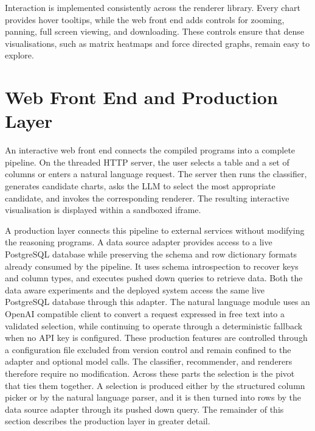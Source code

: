 
Interaction is implemented consistently across the renderer library. Every chart provides hover tooltips, while the web front end adds controls for zooming, panning, full screen viewing, and downloading. These controls ensure that dense visualisations, such as matrix heatmaps and force directed graphs, remain easy to explore.


\section{Web Front End and Production Layer}
\label{sec:impl-production}

An interactive web front end connects the compiled programs into a complete pipeline. On the threaded HTTP server, the user selects a table and a set of columns or enters a natural language request. The server then runs the classifier, generates candidate charts, asks the LLM to select the most appropriate candidate, and invokes the corresponding renderer. The resulting interactive visualisation is displayed within a sandboxed iframe. 

A production layer connects this pipeline to external services without modifying the reasoning programs. A data source adapter provides access to a live PostgreSQL database while preserving the schema and row dictionary formats already consumed by the pipeline. It uses schema introspection to recover keys and column types, and executes pushed down queries to retrieve data. Both the data aware experiments and the deployed system access the same live PostgreSQL database through this adapter. The natural language module uses an OpenAI compatible client to convert a request expressed in free text into a validated selection, while continuing to operate through a deterministic fallback when no API key is configured. These production features are controlled through a configuration file excluded from version control and remain confined to the adapter and optional model calls. The classifier, recommender, and renderers therefore require no modification. Across these parts the selection is the pivot that ties them together. A selection is produced either by the structured column picker or by the natural language parser, and it is then turned into rows by the data source adapter through its pushed down query. The remainder of this section describes the production layer in greater detail.

